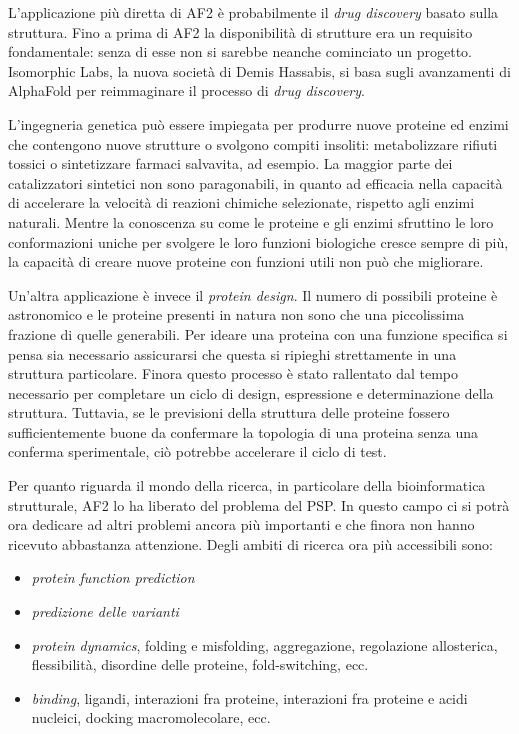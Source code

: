 L'applicazione più diretta di AF2 è probabilmente il \textit{drug discovery} basato sulla struttura. Fino a prima di AF2 la disponibilità di strutture era un requisito fondamentale: senza di esse non si sarebbe neanche cominciato un progetto. Isomorphic Labs, la nuova società di Demis Hassabis, si basa sugli avanzamenti di AlphaFold per reimmaginare il processo di \textit{drug discovery}.

\par L'ingegneria genetica può essere impiegata per produrre nuove proteine ed enzimi che contengono nuove strutture o svolgono compiti insoliti: metabolizzare rifiuti tossici o sintetizzare farmaci salvavita, ad esempio. La maggior parte dei catalizzatori sintetici non sono paragonabili, in quanto ad efficacia nella capacità di accelerare la velocità di reazioni chimiche selezionate, rispetto agli enzimi naturali. Mentre la conoscenza su come le proteine e gli enzimi sfruttino le loro conformazioni uniche per svolgere le loro funzioni biologiche cresce sempre di più, la capacità di creare nuove proteine con funzioni utili non può che migliorare\supercite{alberts2018essential}.

\par Un'altra applicazione è invece il \textit{protein design}. Il numero di possibili proteine è astronomico e le proteine presenti in natura non sono che una piccolissima frazione di quelle generabili. Per ideare una proteina con una funzione specifica si pensa sia necessario assicurarsi che questa si ripieghi strettamente in una struttura particolare. Finora questo processo è stato rallentato dal tempo necessario per completare un ciclo di design, espressione e determinazione della struttura. Tuttavia, se le previsioni della struttura delle proteine fossero sufficientemente buone da confermare la topologia di una proteina senza una conferma sperimentale, ciò potrebbe accelerare il ciclo di test. \\

\par Per quanto riguarda il mondo della ricerca, in particolare della bioinformatica strutturale, AF2 lo ha liberato del problema del PSP. In questo campo ci si potrà ora dedicare ad altri problemi ancora più importanti e che finora non hanno ricevuto abbastanza attenzione. Degli ambiti di ricerca ora più accessibili sono:

\begin{itemize}
	\item \textit{protein function prediction} 
	\item \textit{predizione delle varianti}
	\item \textit{protein dynamics}, folding e misfolding, aggregazione, regolazione allosterica, flessibilità, disordine delle proteine, fold-switching, ecc.
	\item \textit{binding}, ligandi, interazioni fra proteine, interazioni fra proteine e acidi nucleici, docking macromolecolare, ecc.
\end{itemize}

